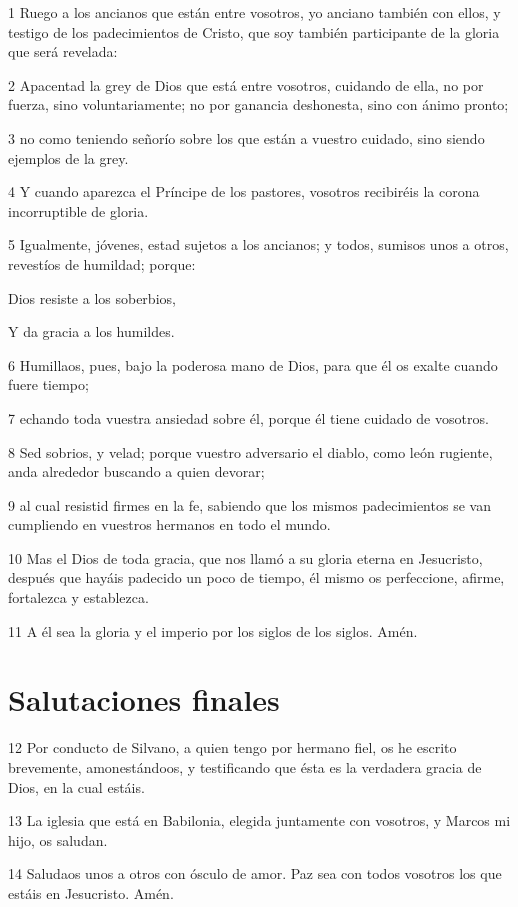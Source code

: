\par 1 Ruego a los ancianos que están entre vosotros, yo anciano también con ellos, y testigo de los padecimientos de Cristo, que soy también participante de la gloria que será revelada:
\par 2 Apacentad la grey de Dios que está entre vosotros, cuidando de ella, no por fuerza, sino voluntariamente; no por ganancia deshonesta, sino con ánimo pronto;
\par 3 no como teniendo señorío sobre los que están a vuestro cuidado, sino siendo ejemplos de la grey.
\par 4 Y cuando aparezca el Príncipe de los pastores, vosotros recibiréis la corona incorruptible de gloria.
\par 5 Igualmente, jóvenes, estad sujetos a los ancianos; y todos, sumisos unos a otros, revestíos de humildad; porque:
\par Dios resiste a los soberbios,
\par Y da gracia a los humildes.
\par 6 Humillaos, pues, bajo la poderosa mano de Dios, para que él os exalte cuando fuere tiempo;
\par 7 echando toda vuestra ansiedad sobre él, porque él tiene cuidado de vosotros.
\par 8 Sed sobrios, y velad; porque vuestro adversario el diablo, como león rugiente, anda alrededor buscando a quien devorar;
\par 9 al cual resistid firmes en la fe, sabiendo que los mismos padecimientos se van cumpliendo en vuestros hermanos en todo el mundo.
\par 10 Mas el Dios de toda gracia, que nos llamó a su gloria eterna en Jesucristo, después que hayáis padecido un poco de tiempo, él mismo os perfeccione, afirme, fortalezca y establezca.
\par 11 A él sea la gloria y el imperio por los siglos de los siglos. Amén.

\section*{Salutaciones finales}

\par 12 Por conducto de Silvano, a quien tengo por hermano fiel, os he escrito brevemente, amonestándoos, y testificando que ésta es la verdadera gracia de Dios, en la cual estáis.
\par 13 La iglesia que está en Babilonia, elegida juntamente con vosotros, y Marcos mi hijo, os saludan.
\par 14 Saludaos unos a otros con ósculo de amor. Paz sea con todos vosotros los que estáis en Jesucristo. Amén.

